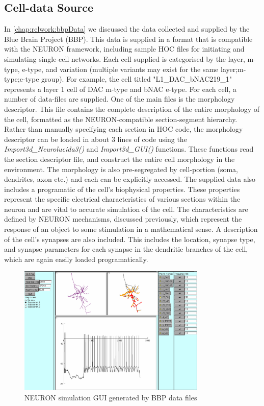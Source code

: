 \subsection{Cell-data Source}
In \ref{chap:relwork:bbpData} we discussed the data collected and supplied by the Blue Brain Project (BBP). This data is supplied in a format that is compatible with the NEURON framework, including sample HOC files for initiating and simulating single-cell networks. Each cell supplied is categorised by the layer, m-type, e-type, and variation (multiple variants may exist for the same layer;m-type;e-type group). For example, the cell titled "L1\_DAC\_bNAC219\_1" represents a layer 1 cell of DAC m-type and bNAC e-type. For each cell, a number of data-files are supplied. One of the main files is the morphology descriptor. This file contains the complete description of the entire morphology of the cell, formatted as the NEURON-compatible section-segment hierarchy. Rather than manually specifying each section in HOC code, the morphology descriptor can be loaded in about 3 lines of code using the \emph{Import3d\_Neurolucida3()} and \emph{Import3d\_GUI()} functions. These functions read the section descriptor file, and construct the entire cell morphology in the environment. The morphology is also pre-segregated by cell-portion (soma, dendrites, axon etc.) and each can be explicitly accessed. The supplied data also includes a programatic of the cell's biophysical properties. These properties represent the specific electrical characteristics of various sections within the neuron and are vital to accurate simulation of the cell. The characteristics are defined by NEURON mechanisms, discussed previously, which represent the response of an object to some stimulation in a mathematical sense. A description of the cell's synapses are also included. This includes the location, synapse type, and synapse parameters for each synapse in the dendritic branches of the cell, which are again easily loaded programatically. \\
\begin{figure}[ht]
    \centering
    \includegraphics[width=0.8\textwidth]{04-Methodology/nrnSample.png}
    \caption{NEURON simulation GUI generated by BBP data files}
    \label{fig:bbpNrnGui}
\end{figure}

